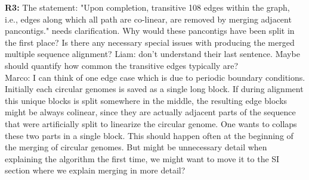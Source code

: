 \documentclass[aps,rmp,onecolumn]{revtex4-1}
\newcommand{\Marco}[1]{{\color{gray}Marco: #1}}
\newcommand{\Liam}[1]{{\color{teal}Liam: #1}}
\newcommand{\reviewer}[2]{\textbf{#1:} #2\vskip 5mm}
\begin{document}
\reviewer{R3}{The statement: "Upon completion, transitive 108 edges within the graph, i.e., edges along which all path are co-linear, are removed by merging adjacent pancontigs." needs clarification. Why would these pancontigs have been split in the first place? Is there any necessary special issues with producing the merged multiple sequence alignment?}
\Liam{don't understand their last sentence. Maybe should quantify how common the transitive edges typically are?}\\
\Marco{I can think of one edge case which is due to periodic boundary conditions. Initially each circular genomes is saved as a single long block. If during alignment this unique blocks is split somewhere in the middle, the resulting edge blocks might be always colinear, since they are actually adjacent parts of the sequence that were artificially split to linearize the circular genome. One wants to collaps these two parts in a single block. This should happen often at the beginning of the merging of circular genomes. But might be unnecessary detail when explaining the algorithm the first time, we might want to move it to the SI section where we explain merging in more detail?}\\
\end{document}
